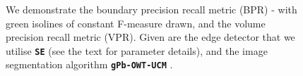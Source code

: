 \begin{figure}[t]
\centering
\caption[{\tt SE} and {\tt gPb-OWT-UCM} comparison - plots]{We demonstrate the boundary precision recall metric (BPR) - with %
green isolines of constant F-measure drawn, and the volume precision recall metric (VPR). Given are the edge detector that we utilise \textbf{\texttt{SE}} \cite{DollarICCV13edges} (see the text for parameter details), and the image segmentation algorithm \textbf{\texttt{gPb-OWT-UCM}} \cite{Arbelaez11}.}
\label{fig:SE_vs_gPb_OWT_UCM}
\end{figure}

